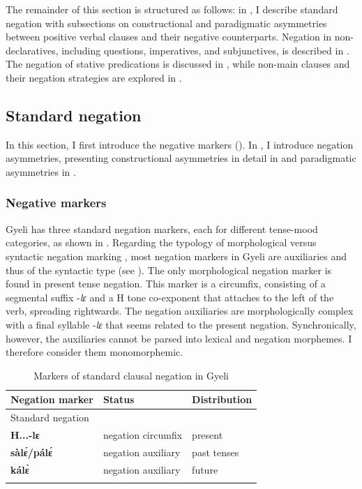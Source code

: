 \documentclass[output=paper,colorlinks=true, citecolor=brown,draftmode]{langscibook}
\begin{document}
The remainder of this section is structured as follows: in , I describe standard negation with subsections on constructional and paradigmatic asymmetries between positive verbal clauses and their negative counterparts. Negation in non-declaratives, including questions, imperatives, and subjunctives, is described in . The negation of stative predications is discussed in , while non-main clauses and their negation strategies are explored in .  

\subsection{Standard negation}
\label{sec:gye:SN}

In this section, I first introduce the negative markers (). In , I introduce negation asymmetries, presenting constructional asymmetries in detail in  and paradigmatic asymmetries in . 

\subsubsection{Negative markers}
\label{sec:gye:NegMarkers}

Gyeli has three standard negation markers, each for different tense-mood categories, as shown in . Regarding the typology of morphological versus syntactic negation marking \citep{Dahl1979,Payne1985}, most negation markers in Gyeli are auxiliaries and thus of the syntactic type (see ). The only morphological negation marker is found in present tense negation. This marker is a circumfix, consisting of a segmental suffix -{\itshape lɛ} and a H tone co-exponent that attaches to the left of the verb, spreading rightwards. The negation auxiliaries are morphologically complex with a final syllable -{\itshape lɛ} that seems related to the present negation. Synchronically, however, the auxiliaries cannot be parsed into lexical and negation morphemes. I therefore consider them monomorphemic.

\begin{table}
    \caption{Markers of standard clausal negation in Gyeli}
    \label{tab:2:negmarkers1}
    \begin{tabular}{lll}
      \lsptoprule
        Negation marker & Status & Distribution \\
        \midrule
        \multicolumn{3}{l}{Standard negation} \\
        {\bfseries H...-lɛ} &  negation circumfix & present \\
        {\bfseries sàlɛ́/pálɛ́} &  negation auxiliary & past tenses \\
        {\bfseries kálɛ̀} &  negation auxiliary & future \\
      \lspbottomrule
    \end{tabular}
\end{table}
\end{document}
